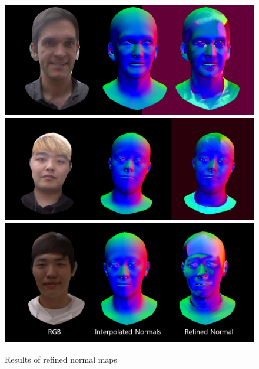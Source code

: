 \documentclass[10pt,twocolumn,letterpaper]{article}
\begin{document}
\begin{figure}[!h]
\begin{center}
    \includegraphics [scale=0.31] {image/normals1.png}
    \includegraphics [scale=0.312] {image/normals2.png}
    \includegraphics [scale=0.31] {image/normals3.png}
\end{center}
\caption{Results of refined normal maps}
\label{fig:normals}
\end{figure} 
\end{document}
